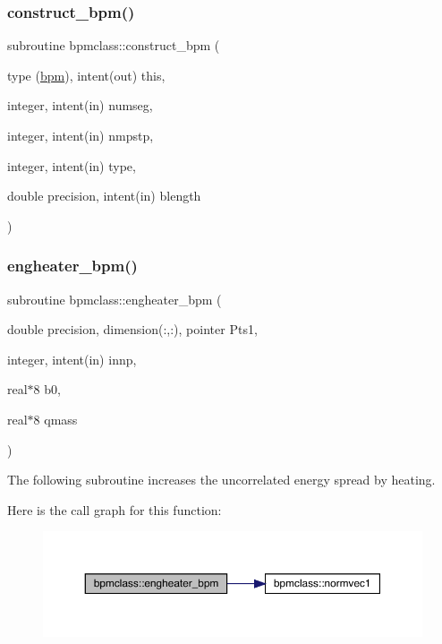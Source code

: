 \subsubsection{\texorpdfstring{construct\_bpm()}{construct\_bpm()}}
{\footnotesize\ttfamily subroutine bpmclass\+::construct\+\_\+bpm (\begin{DoxyParamCaption}\item[{type (\mbox{\hyperlink{namespacebpmclass_structbpmclass_1_1bpm}{bpm}}), intent(out)}]{this,  }\item[{integer, intent(in)}]{numseg,  }\item[{integer, intent(in)}]{nmpstp,  }\item[{integer, intent(in)}]{type,  }\item[{double precision, intent(in)}]{blength }\end{DoxyParamCaption})}

\mbox{\label{namespacebpmclass_a8dac48fd52502e9f007f96a30003e1c8}} 
\subsubsection{\texorpdfstring{engheater\_bpm()}{engheater\_bpm()}}
{\footnotesize\ttfamily subroutine bpmclass\+::engheater\+\_\+bpm (\begin{DoxyParamCaption}\item[{double precision, dimension(\+:,\+:), pointer}]{Pts1,  }\item[{integer, intent(in)}]{innp,  }\item[{real$\ast$8}]{b0,  }\item[{real$\ast$8}]{qmass }\end{DoxyParamCaption})}



The following subroutine increases the uncorrelated energy spread by heating. 

Here is the call graph for this function\+:\nopagebreak
\begin{figure}[H]
\begin{center}
\leavevmode
\includegraphics[width=350pt]{namespacebpmclass_a8dac48fd52502e9f007f96a30003e1c8_cgraph}
\end{center}
\end{figure}
\mbox{\label{namespacebpmclass_ac5588f058f6a85c7c6c131ca7172065d}} 
